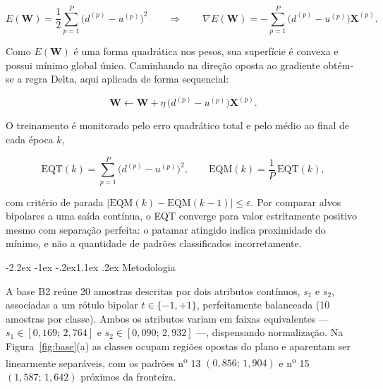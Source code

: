 \documentclass[12pt,a4paper]{article}
\makeatletter
\renewcommand\section{\@startsection{section}{1}{\z@}%
  {-2.2ex \@plus -1ex \@minus -.2ex}{1.1ex \@plus .2ex}%
  {\normalfont\large\bfseries}}
\makeatother
\begin{document}
\begin{equation}
E(\mathbf{W}) = \frac{1}{2}\sum_{p=1}^{P}\bigl(d^{(p)} - u^{(p)}\bigr)^{2}
\qquad\Longrightarrow\qquad
\nabla E(\mathbf{W}) = -\sum_{p=1}^{P}\bigl(d^{(p)} - u^{(p)}\bigr)\mathbf{X}^{(p)} .
\label{eq:custo}
\end{equation}

Como $E(\mathbf{W})$ \'e uma forma quadr\'atica nos pesos, sua superf\'icie \'e
convexa e possui m\'inimo global \'unico. Caminhando na dire\c{c}\~ao oposta ao
gradiente obt\'em-se a regra Delta, aqui aplicada de forma sequencial:

\begin{equation}
\mathbf{W} \leftarrow \mathbf{W} + \eta\,\bigl(d^{(p)} - u^{(p)}\bigr)\mathbf{X}^{(p)} .
\label{eq:delta}
\end{equation}

O treinamento \'e monitorado pelo erro quadr\'atico total e pelo m\'edio ao final
de cada \'epoca $k$,

\begin{equation}
\mathrm{EQT}(k) = \sum_{p=1}^{P}\bigl(d^{(p)} - u^{(p)}\bigr)^{2},
\qquad
\mathrm{EQM}(k) = \frac{1}{P}\,\mathrm{EQT}(k),
\label{eq:eqt}
\end{equation}

\noindent com crit\'erio de parada
$\bigl|\mathrm{EQM}(k) - \mathrm{EQM}(k-1)\bigr| \le \varepsilon$. Por comparar
alvos bipolares a uma sa\'ida cont\'inua, o EQT converge para valor estritamente
positivo mesmo com separa\c{c}\~ao perfeita: o patamar atingido indica proximidade
do m\'inimo, e n\~ao a quantidade de padr\~oes classificados incorretamente.

\section{Metodologia}
\label{sec:met}

A base B2 re\'une 20 amostras descritas por dois atributos cont\'inuos, $s_1$ e
$s_2$, associadas a um r\'otulo bipolar $t \in \{-1,+1\}$, perfeitamente balanceada
(10 amostras por classe). Ambos os atributos variam em faixas equivalentes ---
$s_1 \in [0{,}169;\,2{,}764]$ e $s_2 \in [0{,}090;\,2{,}932]$ ---, dispensando
normaliza\c{c}\~ao. Na Figura~\ref{fig:base}(a) as classes ocupam regi\~oes opostas
do plano e aparentam ser linearmente separ\'aveis, com os padr\~oes
n\textsuperscript{o} 13 $(0{,}856;\,1{,}904)$ e n\textsuperscript{o} 15
$(1{,}587;\,1{,}642)$ pr\'oximos da fronteira.
\end{document}
